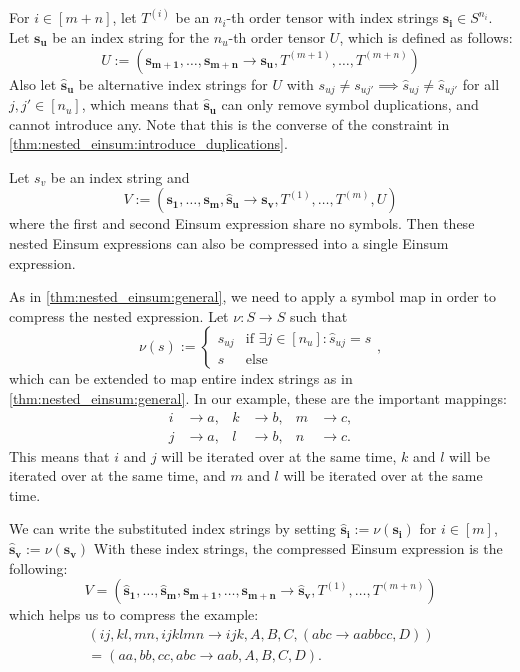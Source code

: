 \begin{theorem}
    \label{thm:nested_einsum:3}

    For $i \in [m + n]$, let $T^{(i)}$ be an $n_i$-th order tensor with index strings $\bm{s_i} \in S^{n_i}$.
    Let $\bm{s_u}$ be an index string for the $n_u$-th order tensor $U$, which is defined as follows:
    $$U := (\bm{s_{m + 1}},\dots,\bm{s_{m + n}} \rightarrow \bm{s_u}, T^{(m + 1)},\dots,T^{(m + n)})$$
    Also let $\bm{\hat{s}_u}$ be alternative index strings for $U$ with $s_{uj} \neq s_{uj'} \implies \hat{s}_{uj} \neq \hat{s}_{uj'}$ for all $j, j' \in [n_u]$,
    which means that $\bm{\hat{s}_u}$ can only remove symbol duplications, and cannot introduce any.
    Note that this is the converse of the constraint in \cref{thm:nested_einsum:introduce_duplications}.

    Let $s_v$ be an index string and
    $$V := (\bm{s_1},\dots,\bm{s_m}, \bm{\hat{s}_u} \rightarrow \bm{s_v}, T^{(1)},\dots,T^{(m)}, U)$$
    where the first and second Einsum expression share no symbols.
    Then these nested Einsum expressions can also be compressed into a single Einsum expression.

    As in \cref{thm:nested_einsum:general}, we need to apply a symbol map in order to compress the nested expression.
    Let $\nu: S \rightarrow S$ such that
    $$\nu(s) := \begin{cases}
            s_{uj} & \text{if $\exists j \in [n_u]: \hat{s}_{uj} = s$} \\
            s      & \text{else}
        \end{cases},$$
    which can be extended to map entire index strings as in \cref{thm:nested_einsum:general}.
    In our example, these are the important mappings:
    \begin{align*}
        i & \rightarrow a, & k & \rightarrow b, & m & \rightarrow c, \\
        j & \rightarrow a, & l & \rightarrow b, & n & \rightarrow c.
    \end{align*}
    This means that $i$ and $j$ will be iterated over at the same time, $k$ and $l$ will be iterated over at the same time, and $m$ and $l$ will be iterated over at the same time.

    We can write the substituted index strings by setting $\bm{\hat{s}_i} := \nu(\bm{s_i})$ for $i \in [m]$, $\bm{\hat{s}_v} := \nu(\bm{s_v})$
    With these index strings, the compressed Einsum expression is the following:
    $$V = (\bm{\hat{s}_1},\dots,\bm{\hat{s}_m}, \bm{s_{m + 1}}, \dots, \bm{s_{m + n}} \rightarrow \bm{\hat{s}_v}, T^{(1)},\dots,T^{(m + n)})$$
    which helps us to compress the example:
    \begin{gather*}
        (ij, kl, mn, ijklmn \rightarrow ijk, A, B, C, (abc \rightarrow aabbcc, D))\\
        = (aa, bb, cc, abc \rightarrow aab, A, B, C, D).
    \end{gather*}
\end{theorem}

